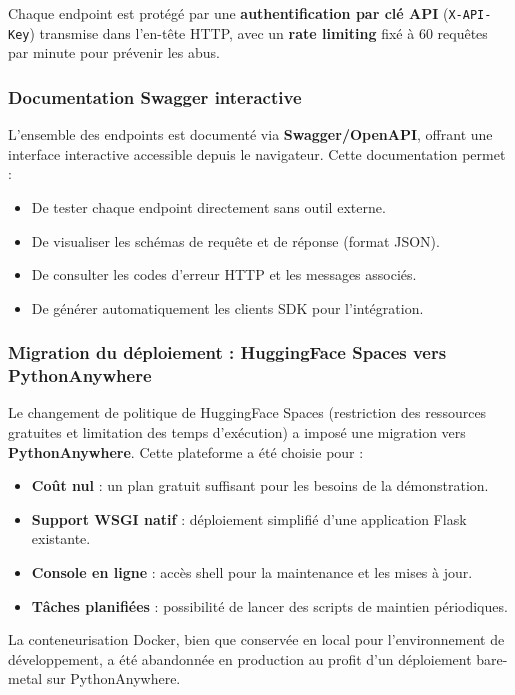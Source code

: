 Chaque endpoint est protégé par une \textbf{authentification par clé API} (\texttt{X-API-Key}) transmise dans l'en-tête HTTP, avec un \textbf{rate limiting} fixé à 60 requêtes par minute pour prévenir les abus.

\subsubsection{Documentation Swagger interactive}

L'ensemble des endpoints est documenté via \textbf{Swagger/OpenAPI}, offrant une interface interactive accessible depuis le navigateur. Cette documentation permet :

\begin{itemize}
    \item De tester chaque endpoint directement sans outil externe.
    \item De visualiser les schémas de requête et de réponse (format JSON).
    \item De consulter les codes d'erreur HTTP et les messages associés.
    \item De générer automatiquement les clients SDK pour l'intégration.
\end{itemize}

\subsubsection{Migration du déploiement : HuggingFace Spaces vers PythonAnywhere}

Le changement de politique de HuggingFace Spaces (restriction des ressources gratuites et limitation des temps d'exécution) a imposé une migration vers \textbf{PythonAnywhere}. Cette plateforme a été choisie pour :

\begin{itemize}
    \item \textbf{Coût nul} : un plan gratuit suffisant pour les besoins de la démonstration.
    \item \textbf{Support WSGI natif} : déploiement simplifié d'une application Flask existante.
    \item \textbf{Console en ligne} : accès shell pour la maintenance et les mises à jour.
    \item \textbf{Tâches planifiées} : possibilité de lancer des scripts de maintien périodiques.
\end{itemize}

La conteneurisation Docker, bien que conservée en local pour l'environnement de développement, a été abandonnée en production au profit d'un déploiement bare-metal sur PythonAnywhere.

